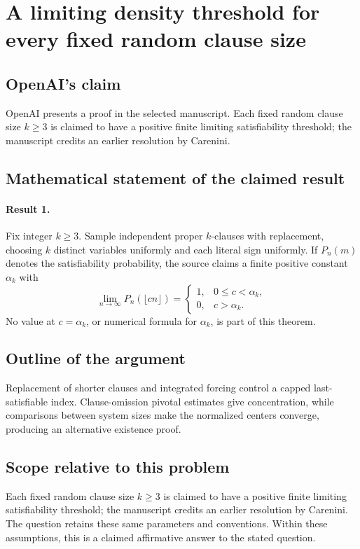\documentclass[11pt]{article}
\begin{document}
\section*{A limiting density threshold for every fixed random clause size}

\subsection{OpenAI's claim}
OpenAI presents a proof in the selected manuscript. Each fixed random clause size $k\geq3$ is claimed to have a positive finite limiting satisfiability threshold; the manuscript credits an earlier resolution by Carenini.

\subsection{Mathematical statement of the claimed result}
\paragraph{Result 1.} Fix integer \(k\ge3\). Sample independent proper \(k\)-clauses with replacement, choosing \(k\) distinct variables uniformly and each literal sign uniformly. If \(P_n(m)\) denotes the satisfiability probability, the source claims a finite positive constant \(\alpha_k\) with
\[
 \lim_{n\to\infty}P_n(\lfloor cn\rfloor)=
 \begin{cases}1,&0\le c<\alpha_k,\\0,&c>\alpha_k.\end{cases}
\]
No value at \(c=\alpha_k\), or numerical formula for \(\alpha_k\), is part of this theorem.

\subsection{Outline of the argument}
Replacement of shorter clauses and integrated forcing control a capped last-satisfiable index. Clause-omission pivotal estimates give concentration, while comparisons between system sizes make the normalized centers converge, producing an alternative existence proof.

\subsection{Scope relative to this problem}
Each fixed random clause size $k\geq3$ is claimed to have a positive finite limiting satisfiability threshold; the manuscript credits an earlier resolution by Carenini. The question retains these same parameters and conventions. Within these assumptions, this is a claimed affirmative answer to the stated question.
\end{document}
